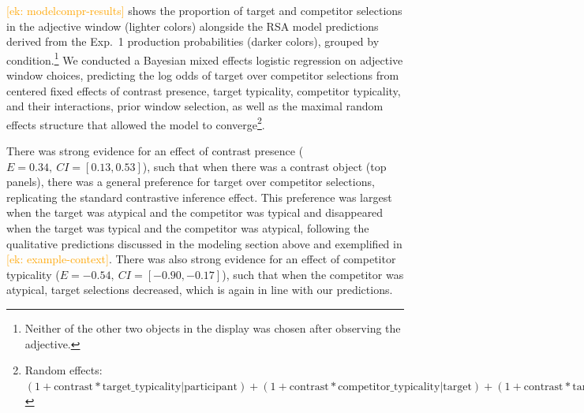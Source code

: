 \documentclass[a4paper,man,floatsintext,natbib]{apa6}
\newcommand{\ek}[1]{\textcolor{Orange}{[ek: #1]}}
\newcommand{\figref}[1]{Figure~\ref{#1}}
\begin{document}
\ek{modelcompr-results} shows the proportion of target and competitor selections in the adjective window (lighter colors) alongside the RSA model predictions derived from the Exp.~1 production probabilities (darker colors), grouped by condition.\footnote{Neither of the other two objects in the display was chosen after observing the adjective.} %
We conducted a Bayesian mixed effects logistic regression on adjective window choices, predicting the log odds of target over competitor selections from centered fixed effects of contrast presence, target typicality, competitor typicality, and their interactions, prior window selection, as well as the maximal random effects structure that allowed the model to converge\footnote{Random effects: $(1+\text{contrast}*\text{target\_typicality}|\text{participant}) + (1+\text{contrast}*\text{competitor\_typicality}|\text{target}) + (1+\text{contrast}*\text{target\_typicality}|\text{competitor})$}.

There was strong evidence for an effect of contrast presence ($E=0.34,\ CI=[0.13,0.53]$), such that when there was a contrast object (top panels), there was a general preference for target over competitor selections, replicating the standard contrastive inference effect. This preference was largest when the target was atypical and the competitor was typical and disappeared when the target was typical and the competitor was atypical, following the qualitative predictions discussed in the modeling section above and exemplified in \ek{example-context}. There was also strong evidence for an effect of competitor typicality ($E=-0.54,\ CI=[-0.90,-0.17]$), such that when the competitor was atypical, target selections decreased, which is again in line with our predictions.


\end{document}
